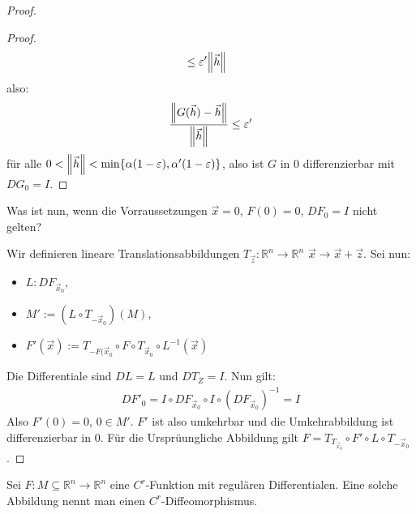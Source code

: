 \documentclass{report}
\renewcommand\epsilon{\varepsilon}
\newcommand*{\newpar}{\par\vspace{\baselineskip}\noindent}
\newcommand{\bR}{\mathbb{R}}
\newcommand{\vh}{\vec{h}}
\newcommand{\vx}{\vec{x}}
\newcommand{\zz}{\vec{z}}
\begin{document}
\begin{proof}
\begin{proof}
\begin{align*}
                      &\leq \epsilon' \norm{\vh}
 \end{align*}
 also:
 \begin{align*}
  \frac{\norm{G(\vh) - \vh}}{\norm{\vh}} \leq \epsilon'
 \end{align*}
 für alle $0 < \norm{\vh} < \min \{\alpha(1 - \epsilon), \alpha' (1 - \epsilon)\}$, also ist $G$ in $0$ differenzierbar mit $DG_0 = I$.
 \end{proof}
 Was ist nun, wenn die Vorraussetzungen $\vx = 0$, $F(0) = 0$, $DF_0 = I$ nicht gelten?
 \newpar
 Wir definieren lineare Translationsabbildungen $T_{\zz} : \bR^n \to \bR^n$ $\vx \to \vx + \zz$. Sei nun:
 \begin{itemize}
  \item $L : DF_{\vx_0}$,
  \item $M' := (L \circ T_{-\vx_0})(M)$,
  \item $F'(\vx) := T_{-F(\vx_0} \circ F \circ T_{\vx_0} \circ L^{-1}(\vx)$
 \end{itemize}
 Die Differentiale sind $DL = L$ und $DT_Z = I$. Nun gilt:
 \begin{align*}
  DF'_{0} = I \circ DF_{\vx_0} \circ I \circ (DF_{\vx_0})^{-1} = I
 \end{align*}
 Also $F'(0) = 0$, $0 \in M'$. $F'$ ist also umkehrbar und die Umkehrabbildung ist differenzierbar in $0$. Für die Ursprüungliche Abbildung gilt $F = T_{T_{\vx_0}} \circ F' \circ L \circ T_{-\vx_0}$.
\end{proof}
\begin{definition}
 Sei $F : M \subseteq \bR^n \to \bR^n$ eine $C^r$-Funktion mit regulären Differentialen. Eine solche Abbildung nennt man einen $C^r$-Diffeomorphismus.
\end{definition}


%
%
%
%
%
%
%
%
%
%
%
\end{document}
